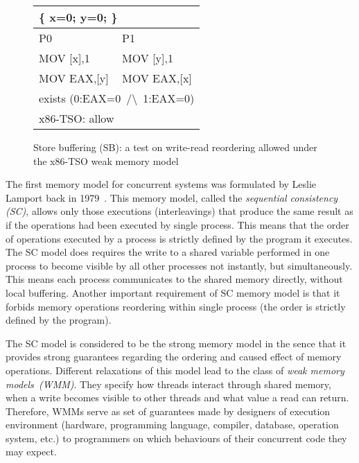 \begin{figure}
\small \ttfamily
\begin{tabular}{ |l|l| }
\hline
\multicolumn{2}{|l|}{ \{ x=0; y=0; \}} \tabularnewline \hline
P0 & P1 \\ \hline
MOV [x],1 & MOV [y],1 \\
MOV EAX,[y] & MOV EAX,[x] \\
\hline
\multicolumn{2}{|l|}{exists (0:EAX=0~/\textbackslash~1:EAX=0)} \tabularnewline
\hline
\multicolumn{2}{|l|}{x86-TSO: allow} \tabularnewline
\hline

\end{tabular}
\caption{Store buffering (SB): a test on write-read reordering allowed under the x86-TSO weak memory model}
\label{simple_wmm_x86}
\end{figure}

The first memory model for concurrent systems was formulated by Leslie Lamport back in 1979~\cite{lamport1979make}. This memory model, called the \textit{sequential consistency (SC)}, allows only those executions (interleavings) that produce the same result as if the operations had been executed by single process. This means that the order of operations executed by a process is strictly defined by the program it executes. The SC model does requires the write to a shared variable performed in one process to become visible by all other processes not instantly, but simultaneously. This means each process communicates to the shared memory directly, without local buffering. Another important requirement of SC memory model is that it forbids memory operations reordering within single process (the order is strictly defined by the program).

The SC model is considered to be the strong memory model in the sence that it provides strong guarantees regarding the ordering and caused effect of memory operations. Different relaxations of this model lead to the class of \textit{weak memory models~(WMM)}.
They specify how threads interact through shared memory, when a write becomes visible to other threads and what value a read can return. 
Therefore, WMMs serve as set of guarantees made by designers of execution environment (hardware, programming language, compiler, database, operation system, etc.) to programmers on which behaviours of their concurrent code they may expect. 

